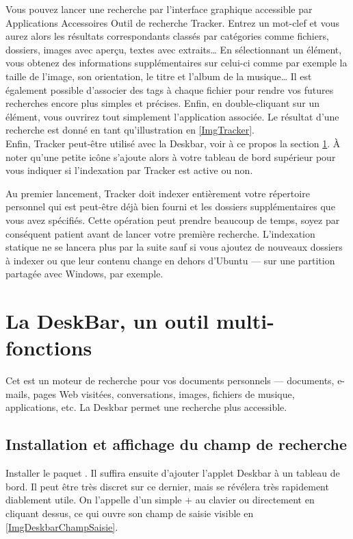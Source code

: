 Vous pouvez lancer une recherche par l'interface graphique accessible par Applications \FlecheDroite Accessoires \FlecheDroite Outil de recherche Tracker. Entrez un mot-clef et vous aurez alors les résultats correspondants classés par catégories comme fichiers, dossiers, images avec aperçu, textes avec extraits\ldots{} En sélectionnant un élément, vous obtenez des informations supplémentaires sur celui-ci comme par exemple la taille de l'image, son orientation, le titre et l'album de la musique\ldots{} Il est également possible d'associer des tags à chaque fichier pour rendre vos futures recherches encore plus simples et précises. Enfin, en double-cliquant sur un élément, vous ouvrirez tout simplement l'application associée. Le résultat d'une recherche est donné en tant qu'illustration en \ref{ImgTracker}.\\
Enfin, Tracker peut-être utilisé avec la Deskbar, voir à ce propos la section \ref{RefDeskBar}.
À noter qu'une petite icône s'ajoute alors à votre tableau de bord supérieur pour vous indiquer si l'indexation par Tracker est active ou non.
\begin{attention}
Au premier lancement, Tracker doit indexer entièrement votre répertoire personnel qui est peut-être déjà bien fourni et les dossiers supplémentaires que vous avez spécifiés. Cette opération peut prendre beaucoup de temps, soyez par conséquent patient avant de lancer votre première recherche. L'indexation statique ne se lancera plus par la suite sauf si vous ajoutez de nouveaux dossiers à indexer ou que leur contenu change en dehors d'Ubuntu --- sur une partition partagée avec Windows, par exemple.
\end{attention}
\section{La DeskBar, un outil multi-fonctions}
\label{RefDeskBar}
Cet   est un moteur de recherche pour vos documents personnels --- documents, e-mails, pages Web visitées, conversations, images, fichiers de musique, applications, etc. La Deskbar permet une recherche plus accessible.\par
\subsection{Installation et affichage du champ de recherche}
Installer le paquet . Il suffira ensuite d'ajouter l'applet Deskbar à un tableau de bord. Il peut être très discret sur ce dernier, mais se révélera très rapidement diablement utile. On l'appelle d'un simple  +  au clavier ou directement en cliquant dessus, ce qui ouvre son champ de saisie visible en \ref{ImgDeskbarChampSaisie}.
